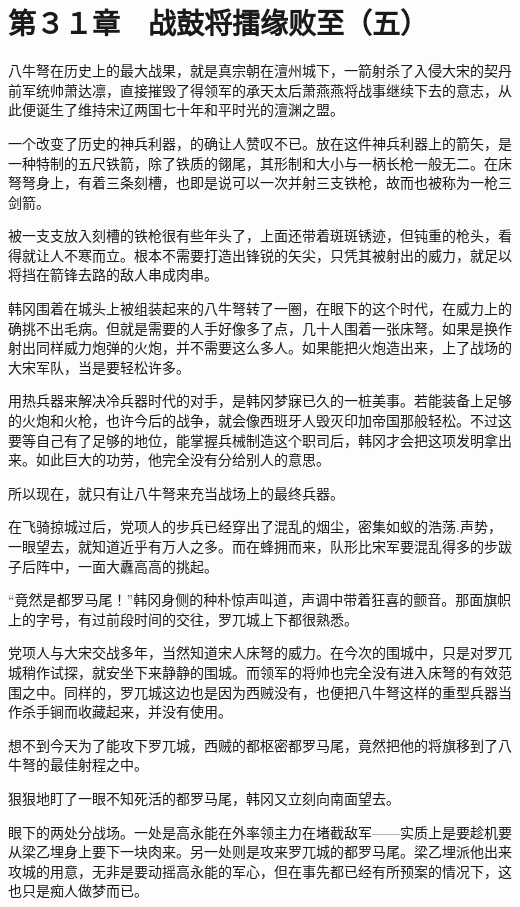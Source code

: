 \section{第３１章　战鼓将擂缘败至（五）}

八牛弩在历史上的最大战果，就是真宗朝在澶州城下，一箭射杀了入侵大宋的契丹前军统帅萧达凛，直接摧毁了得领军的承天太后萧燕燕将战事继续下去的意志，从此便诞生了维持宋辽两国七十年和平时光的澶渊之盟。

一个改变了历史的神兵利器，的确让人赞叹不已。放在这件神兵利器上的箭矢，是一种特制的五尺铁箭，除了铁质的翎尾，其形制和大小与一柄长枪一般无二。在床弩弩身上，有着三条刻槽，也即是说可以一次并射三支铁枪，故而也被称为一枪三剑箭。

被一支支放入刻槽的铁枪很有些年头了，上面还带着斑斑锈迹，但钝重的枪头，看得就让人不寒而立。根本不需要打造出锋锐的矢尖，只凭其被射出的威力，就足以将挡在箭锋去路的敌人串成肉串。

韩冈围着在城头上被组装起来的八牛弩转了一圈，在眼下的这个时代，在威力上的确挑不出毛病。但就是需要的人手好像多了点，几十人围着一张床弩。如果是换作射出同样威力炮弹的火炮，并不需要这么多人。如果能把火炮造出来，上了战场的大宋军队，当是要轻松许多。

用热兵器来解决冷兵器时代的对手，是韩冈梦寐已久的一桩美事。若能装备上足够的火炮和火枪，也许今后的战争，就会像西班牙人毁灭印加帝国那般轻松。不过这要等自己有了足够的地位，能掌握兵械制造这个职司后，韩冈才会把这项发明拿出来。如此巨大的功劳，他完全没有分给别人的意思。

所以现在，就只有让八牛弩来充当战场上的最终兵器。

在飞骑掠城过后，党项人的步兵已经穿出了混乱的烟尘，密集如蚁的浩荡.声势，一眼望去，就知道近乎有万人之多。而在蜂拥而来，队形比宋军要混乱得多的步跋子后阵中，一面大纛高高的挑起。

“竟然是都罗马尾！”韩冈身侧的种朴惊声叫道，声调中带着狂喜的颤音。那面旗帜上的字号，有过前段时间的交往，罗兀城上下都很熟悉。

党项人与大宋交战多年，当然知道宋人床弩的威力。在今次的围城中，只是对罗兀城稍作试探，就安坐下来静静的围城。而领军的将帅也完全没有进入床弩的有效范围之中。同样的，罗兀城这边也是因为西贼没有，也便把八牛弩这样的重型兵器当作杀手锏而收藏起来，并没有使用。

想不到今天为了能攻下罗兀城，西贼的都枢密都罗马尾，竟然把他的将旗移到了八牛弩的最佳射程之中。

狠狠地盯了一眼不知死活的都罗马尾，韩冈又立刻向南面望去。

眼下的两处分战场。一处是高永能在外率领主力在堵截敌军——实质上是要趁机要从梁乙埋身上要下一块肉来。另一处则是攻来罗兀城的都罗马尾。梁乙埋派他出来攻城的用意，无非是要动摇高永能的军心，但在事先都已经有所预案的情况下，这也只是痴人做梦而已。

